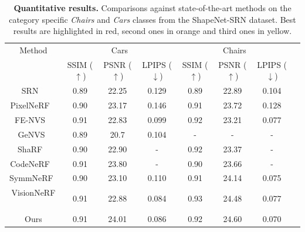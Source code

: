 \begin{table}[h!]
\caption{\textbf{Quantitative results.} Comparisons against state-of-the-art methods on the category specific \textit{Chairs} and \textit{Cars} classes from the ShapeNet-SRN dataset. Best results are highlighted in \colorbox{red!25}{red}, second ones in \colorbox{orange!25}{orange} and third ones in \colorbox{yellow!25}{yellow}. }
\label{table:comp_res}
\begin{center}%
\begin{adjustbox}{width = \linewidth}
\begin{tabular}[h]{c||ccccccc}
\hline
 Method & \multicolumn{3}{c}{Cars} & \multicolumn{3}{c}{Chairs} \\
 &  SSIM ($\uparrow$) & PSNR ($\uparrow$) & LPIPS ($\downarrow$) & SSIM ($\uparrow$) & PSNR ($\uparrow$) & LPIPS ($\downarrow$)\\
\hline
SRN ~\citep{sitzmann2019scene}& \cellcolor{yellow!25}0.89 & 22.25 & 0.129 & 0.89 & 22.89 & 0.104\\
PixelNeRF ~\citep{yu2021pixelnerf} & \cellcolor{orange!25}0.90 & 23.17 & 0.146 & \cellcolor{yellow!25}0.91 & 23.72 & 0.128\\
FE-NVS ~\citep{guo2022fast} & \cellcolor{red!25}0.91 & 22.83 & \cellcolor{yellow!25}0.099 & \cellcolor{orange!25}0.92 & 23.21 & 0.077 \\
GeNVS~\citep{chan2023genvs}& \cellcolor{yellow!25}0.89 & 20.7 & 0.104 & - & - & - \\
ShaRF ~\citep{rematas2021sharf} & \cellcolor{orange!25}0.90 & 22.90 & - & \cellcolor{orange!25}0.92 & 23.37 & - \\
CodeNeRF ~\citep{jang2021codenerf} & \cellcolor{red!25}0.91 & \cellcolor{orange!25}23.80 & - & 0.90 & 23.66 & -  \\
SymmNeRF\footnotemark~\citep{li2022symmnerf}& \cellcolor{orange!25}0.90 & \cellcolor{yellow!25}23.10 & 0.110 & \cellcolor{yellow!25}0.91 & \cellcolor{yellow!25}24.14  & \cellcolor{orange!25}0.075 \\
VisionNeRF ~\citep{lin2023vision} & \cellcolor{red!25}0.91 & 22.88 & \cellcolor{red!25}0.084 & \cellcolor{red!25}0.93 & \cellcolor{orange!25}24.48  & \cellcolor{yellow!25}0.077 \\
Ours &\cellcolor{red!25} 0.91 & \cellcolor{red!25} 24.01  &\cellcolor{orange!25}  0.086 &  \cellcolor{orange!25}0.92   & \cellcolor{red!25}24.60&  \cellcolor{red!25}0.070 \\

\hline 
\end{tabular}
\end{adjustbox}
\end{center}
\end{table}


